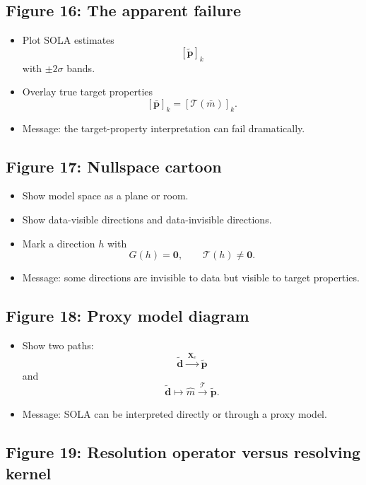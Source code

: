 \documentclass[11pt,openany]{book}
\theoremstyle{definition}
\theoremstyle{remark}
\newcommand{\Tau}{\mathcal{T}}
\begin{document}
\subsection*{Figure 16: The apparent failure}

\begin{itemize}[leftmargin=*]
  \item Plot SOLA estimates
  \[
    [\widetilde{\mathbf p}]_k
  \]
  with \(\pm2\sigma\) bands.
  \item Overlay true target properties
  \[
    [\bar{\mathbf p}]_k=[\Tau(\bar m)]_k.
  \]
  \item Message: the target-property interpretation can fail dramatically.
\end{itemize}

\subsection*{Figure 17: Nullspace cartoon}

\begin{itemize}[leftmargin=*]
  \item Show model space as a plane or room.
  \item Show data-visible directions and data-invisible directions.
  \item Mark a direction \(h\) with
  \[
    G(h)=\mathbf 0,
    \qquad
    \Tau(h)\neq\mathbf 0.
  \]
  \item Message: some directions are invisible to data but visible to target properties.
\end{itemize}

\subsection*{Figure 18: Proxy model diagram}

\begin{itemize}[leftmargin=*]
  \item Show two paths:
  \[
    \widetilde{\mathbf d}
    \xrightarrow{\;\mathbf X_c\;}
    \widetilde{\mathbf p}
  \]
  and
  \[
    \widetilde{\mathbf d}
    \longmapsto
    \hat m
    \xrightarrow{\;\Tau\;}
    \widetilde{\mathbf p}.
  \]
  \item Message: SOLA can be interpreted directly or through a proxy model.
\end{itemize}

\subsection*{Figure 19: Resolution operator versus resolving kernel}
\end{document}
